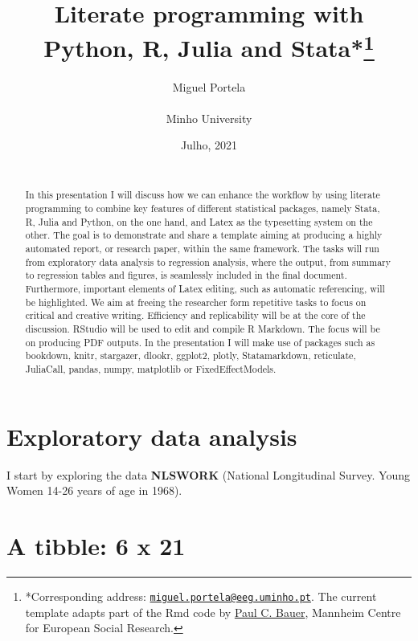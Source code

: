 \documentclass[
  12pt,
]{article}
\title{\hfill\break
\hfill\break
\vspace{1cm}Literate programming with Python, R, Julia and Stata*\footnote{*Corresponding address: \href{mailto:miguel.portela@eeg.uminho.pt}{\nolinkurl{miguel.portela@eeg.uminho.pt}}. The current template adapts part of the Rmd code by \href{https://github.com/paulcbauer/Writing_a_reproducable_paper_in_rmarkdown}{Paul C. Bauer}, Mannheim Centre for European Social Research.}\vspace{0.5cm}\\}
\author{Miguel Portela\\
~\\
Minho University\\}
\date{\hfill\break
\hfill\break
3 Julho, 2021\\
~\\}
\begin{document}
\maketitle
\begin{abstract}
\noindent{}In this presentation I will discuss how we can enhance the workflow by using literate programming to combine key features of different statistical packages, namely Stata, R, Julia and Python, on the one hand, and Latex as the typesetting system on the other. The goal is to demonstrate and share a template aiming at producing a highly automated report, or research paper, within the same framework. The tasks will run from exploratory data analysis to regression analysis, where the output, from summary to regression tables and figures, is seamlessly included in the final document. Furthermore, important elements of Latex editing, such as automatic referencing, will be highlighted. We aim at freeing the researcher form repetitive tasks to focus on critical and creative writing. Efficiency and replicability will be at the core of the discussion. RStudio will be used to edit and compile R Markdown. The focus will be on producing PDF outputs. In the presentation I will make use of packages such as bookdown, knitr, stargazer, dlookr, ggplot2, plotly, Statamarkdown, reticulate, JuliaCall, pandas, numpy, matplotlib or FixedEffectModels.\vspace{.8cm}
\end{abstract}

\clearpage

\renewcommand{\baselinestretch}{0.5}\normalsize

\renewcommand{\baselinestretch}{1.1}\normalsize

\clearpage

\hypertarget{exploratory-data-analysis}{%
\section{Exploratory data analysis}\label{exploratory-data-analysis}}

I start by exploring the data \textbf{NLSWORK} (National Longitudinal Survey. Young Women 14-26 years of age in 1968).

\hypertarget{a-tibble-6-x-21}{%
\section{A tibble: 6 x 21}\label{a-tibble-6-x-21}}
\end{document}

